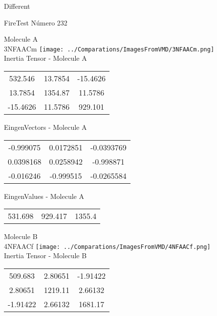 \begin{center}
\vtab
\vtab
\textcolor{NavyBlue}{\Large Different}
\end{center}

 \newpage

\vtab[-2cm]
\begin{center}
{\large FireTest \tab Número 232}
\end{center}
\begin{multicols}{2}
\begin{center}

Molecule A \\ 
3NFAACm
\texttt{[image: ../Comparations/ImagesFromVMD/3NFAACm.png]}
\\
Inertia Tensor - Molecule A \\
\vtab

\begin{tabular}{|c c c|}
532.546	 & 	13.7854	 & 	-15.4626	 \\
13.7854	 & 	1354.87	 & 	11.5786	 \\
-15.4626	 & 	11.5786	 & 	929.101
\end{tabular}

\vtab
 EingenVectors - Molecule A     \\
\vtab
\begin{tabular}{|c c c|}
-0.999075	 & 	0.0172851	 & 	-0.0393769	 \\
0.0398168	 & 	0.0258942	 & 	-0.998871	 \\
-0.016246	 & 	-0.999515	 & 	-0.0265584
\end{tabular}

\vtab
 EingenValues - Molecule A     \\
\vtab
\begin{tabular}{|c c c|}
531.698	 & 	929.417	 & 	1355.4	 \\
\end{tabular}
\columnbreak

Molecule B \\ 
4NFAACf
\texttt{[image: ../Comparations/ImagesFromVMD/4NFAACf.png]}
\\
Inertia Tensor - Molecule B \\
\vtab

\begin{tabular}{|c c c|}
509.683	 & 	2.80651	 & 	-1.91422	 \\
2.80651	 & 	1219.11	 & 	2.66132	 \\
-1.91422	 & 	2.66132	 & 	1681.17
\end{tabular}


\end{center}
\end{multicols}

